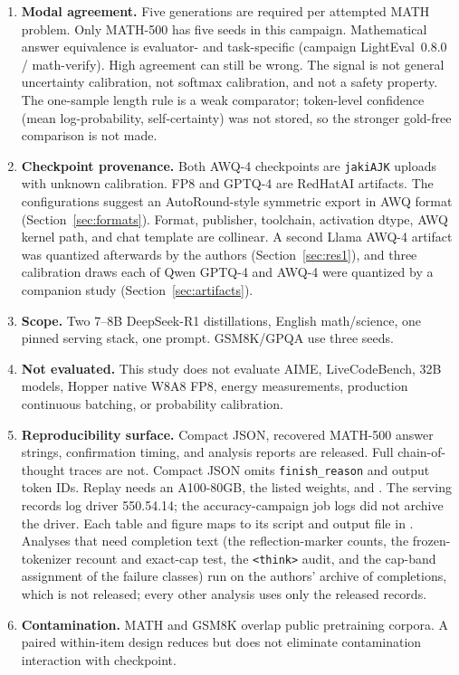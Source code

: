 \documentclass[11pt,a4paper]{article}
\begin{document}
\begin{enumerate}
    \item \textbf{Modal agreement.} Five generations are required per attempted MATH problem. Only MATH-500 has five seeds in this campaign. Mathematical answer equivalence is evaluator- and task-specific (campaign LightEval~0.8.0 / math-verify). High agreement can still be wrong. The signal is not general uncertainty calibration, not softmax calibration, and not a safety property. The one-sample length rule is a weak comparator; token-level confidence (mean log-probability, self-certainty) was not stored, so the stronger gold-free comparison is not made.
    \item \textbf{Checkpoint provenance.} Both AWQ-4 checkpoints are \texttt{jakiAJK} uploads with unknown calibration. FP8 and GPTQ-4 are RedHatAI artifacts. The configurations suggest an AutoRound-style symmetric export in AWQ format (Section~\ref{sec:formats}). Format, publisher, toolchain, activation dtype, AWQ kernel path, and chat template are collinear. A second Llama AWQ-4 artifact was quantized afterwards by the authors (Section~\ref{sec:res1}), and three calibration draws each of Qwen GPTQ-4 and AWQ-4 were quantized by a companion study (Section~\ref{sec:artifacts}).
    \item \textbf{Scope.} Two 7--8B DeepSeek-R1 distillations, English math/science, one pinned serving stack, one prompt. GSM8K/GPQA use three seeds.
    \item \textbf{Not evaluated.} This study does not evaluate AIME, LiveCodeBench, 32B models, Hopper native W8A8 FP8, energy measurements, production continuous batching, or probability calibration.
    \item \textbf{Reproducibility surface.} Compact JSON, recovered MATH-500 answer strings, confirmation timing, and analysis reports are released. Full chain-of-thought traces are not. Compact JSON omits \texttt{finish\_reason} and output token IDs. Replay needs an A100-80GB, the listed weights, and . The serving records log driver 550.54.14; the accuracy-campaign job logs did not archive the driver. Each table and figure maps to its script and output file in . Analyses that need completion text (the reflection-marker counts, the frozen-tokenizer recount and exact-cap test, the \texttt{<think>} audit, and the cap-band assignment of the failure classes) run on the authors' archive of completions, which is not released; every other analysis uses only the released records.
    \item \textbf{Contamination.} MATH and GSM8K overlap public pretraining corpora. A paired within-item design reduces but does not eliminate contamination interaction with checkpoint.

\end{enumerate}
\end{document}
